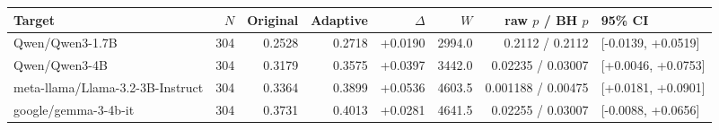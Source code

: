 \begin{tabular}{lrrrrrrl}
\toprule
Target & $N$ & Original & Adaptive & $\Delta$ & $W$ & raw $p$ / BH $p$ & 95\% CI \\
\midrule
Qwen/Qwen3-1.7B & 304 & 0.2528 & 0.2718 & +0.0190 & 2994.0 & 0.2112 / 0.2112 & [-0.0139, +0.0519] \\
Qwen/Qwen3-4B & 304 & 0.3179 & 0.3575 & +0.0397 & 3442.0 & 0.02235 / 0.03007 & [+0.0046, +0.0753] \\
meta-llama/Llama-3.2-3B-Instruct & 304 & 0.3364 & 0.3899 & +0.0536 & 4603.5 & 0.001188 / 0.00475 & [+0.0181, +0.0901] \\
google/gemma-3-4b-it & 304 & 0.3731 & 0.4013 & +0.0281 & 4641.5 & 0.02255 / 0.03007 & [-0.0088, +0.0656] \\
\bottomrule
\end{tabular}
